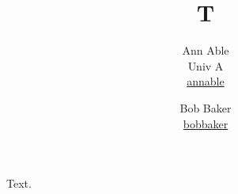 \documentclass{article}
\title{T}
\author{Ann Able \\ Univ A \\ \href{https://www.annable.com}{annable} \and Bob Baker \\ \href{https://www.bobbaker.org}{bobbaker}}
\begin{document}
\maketitle
Text.
\end{document}
